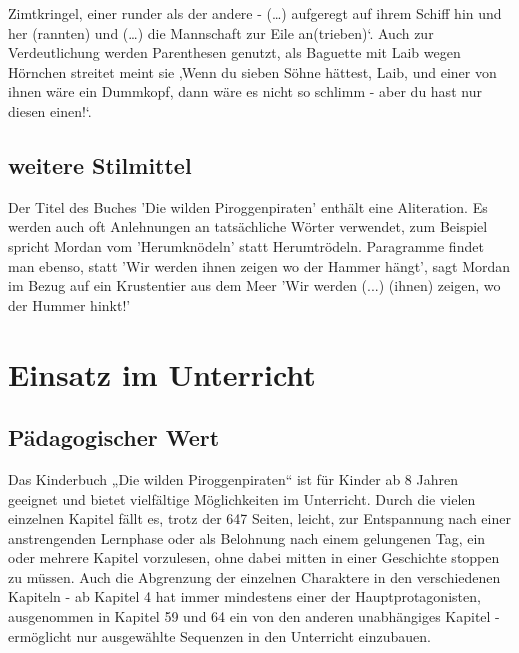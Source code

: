 Zimtkringel, einer runder als der andere - (…) aufgeregt auf ihrem Schiff hin und her (rannten) und (…) die Mannschaft zur Eile an(trieben)‘.\cite[S.52]{pir} Auch zur Verdeutlichung werden Parenthesen genutzt, als Baguette mit Laib wegen Hörnchen streitet \cite[S.87]{pir} meint sie ‚Wenn du sieben Söhne hättest, Laib, und einer von ihnen wäre ein Dummkopf, dann wäre es nicht so schlimm - aber du hast nur diesen einen!‘.\cite[S.87]{pir}

\subsection{weitere Stilmittel}

Der Titel des Buches 'Die wilden Piroggenpiraten' enthält eine Aliteration. Es werden auch oft Anlehnungen an tatsächliche Wörter verwendet, zum Beispiel spricht Mordan vom 'Herumknödeln'\cite[S.250]{pir} statt Herumtrödeln. Paragramme findet man ebenso, statt 'Wir werden ihnen zeigen wo der Hammer hängt', sagt Mordan im Bezug auf ein Krustentier aus dem Meer 'Wir werden (...) (ihnen) zeigen, wo der Hummer hinkt!'\cite[S.250]{pir}

\section{Einsatz im Unterricht}

\subsection{Pädagogischer Wert}
Das Kinderbuch „Die wilden Piroggenpiraten“ ist für Kinder ab 8 Jahren geeignet und bietet vielfältige Möglichkeiten im Unterricht. Durch die vielen einzelnen Kapitel fällt es, trotz der 647 Seiten, leicht, zur Entspannung nach einer anstrengenden Lernphase oder als Belohnung nach einem gelungenen Tag, ein oder mehrere Kapitel vorzulesen, ohne dabei mitten in einer Geschichte stoppen zu müssen. Auch die Abgrenzung der einzelnen Charaktere in den verschiedenen Kapiteln - ab Kapitel 4 hat immer mindestens einer der Hauptprotagonisten, ausgenommen in Kapitel 59 und 64 ein von den anderen unabhängiges Kapitel - ermöglicht nur ausgewählte Sequenzen in den Unterricht einzubauen.

